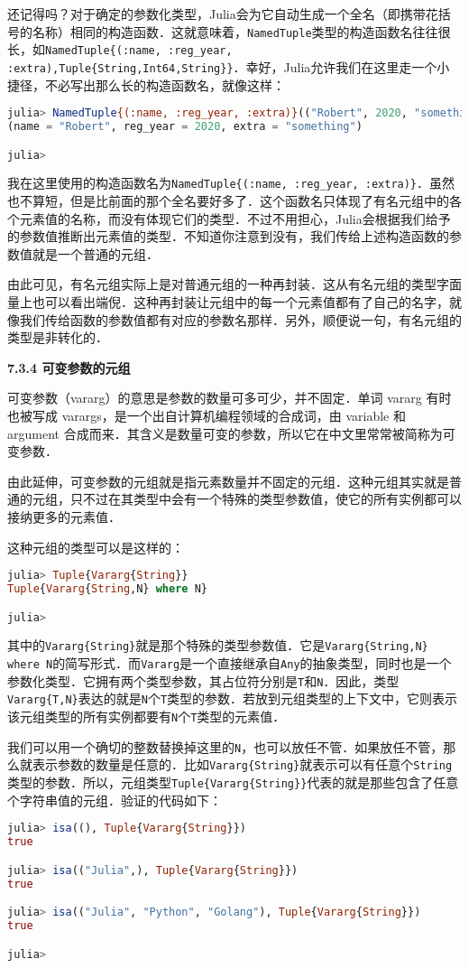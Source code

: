 还记得吗？对于确定的参数化类型，Julia会为它自动生成一个全名（即携带花括号的名称）相同的构造函数．这就意味着，\verb|NamedTuple|类型的构造函数名往往很长，如\verb|NamedTuple{(:name, :reg_year, :extra),Tuple{String,Int64,String}}|．幸好，Julia允许我们在这里走一个小捷径，不必写出那么长的构造函数名，就像这样：
\begin{lstlisting}[language=julia]
julia> NamedTuple{(:name, :reg_year, :extra)}(("Robert", 2020, "something"))
(name = "Robert", reg_year = 2020, extra = "something")

julia> 
\end{lstlisting}

我在这里使用的构造函数名为\verb|NamedTuple{(:name, :reg_year, :extra)}|．虽然也不算短，但是比前面的那个全名要好多了．这个函数名只体现了有名元组中的各个元素值的名称，而没有体现它们的类型．不过不用担心，Julia会根据我们给予的参数值推断出元素值的类型．不知道你注意到没有，我们传给上述构造函数的参数值就是一个普通的元组．

由此可见，有名元组实际上是对普通元组的一种再封装．这从有名元组的类型字面量上也可以看出端倪．这种再封装让元组中的每一个元素值都有了自己的名字，就像我们传给函数的参数值都有对应的参数名那样．另外，顺便说一句，有名元组的类型是非转化的．

\textbf{7.3.4 可变参数的元组}

可变参数（vararg）的意思是参数的数量可多可少，并不固定．单词 vararg 有时也被写成 varargs，是一个出自计算机编程领域的合成词，由 variable 和 argument 合成而来．其含义是数量可变的参数，所以它在中文里常常被简称为可变参数．

由此延伸，可变参数的元组就是指元素数量并不固定的元组．这种元组其实就是普通的元组，只不过在其类型中会有一个特殊的类型参数值，使它的所有实例都可以接纳更多的元素值．

这种元组的类型可以是这样的：
\begin{lstlisting}[language=julia]
julia> Tuple{Vararg{String}}
Tuple{Vararg{String,N} where N}

julia> 
\end{lstlisting}

其中的\verb|Vararg{String}|就是那个特殊的类型参数值．它是\verb|Vararg{String,N} where N|的简写形式．而\verb|Vararg|是一个直接继承自\verb|Any|的抽象类型，同时也是一个参数化类型．它拥有两个类型参数，其占位符分别是\verb|T|和\verb|N|．因此，类型\verb|Vararg{T,N}|表达的就是\verb|N|个\verb|T|类型的参数．若放到元组类型的上下文中，它则表示该元组类型的所有实例都要有\verb|N|个\verb|T|类型的元素值．

我们可以用一个确切的整数替换掉这里的\verb|N|，也可以放任不管．如果放任不管，那么就表示参数的数量是任意的．比如\verb|Vararg{String}|就表示可以有任意个\verb|String|类型的参数．所以，元组类型\verb|Tuple{Vararg{String}}|代表的就是那些包含了任意个字符串值的元组．验证的代码如下：
\begin{lstlisting}[language=julia]
julia> isa((), Tuple{Vararg{String}})
true

julia> isa(("Julia",), Tuple{Vararg{String}})
true

julia> isa(("Julia", "Python", "Golang"), Tuple{Vararg{String}})
true

julia> 
\end{lstlisting}

